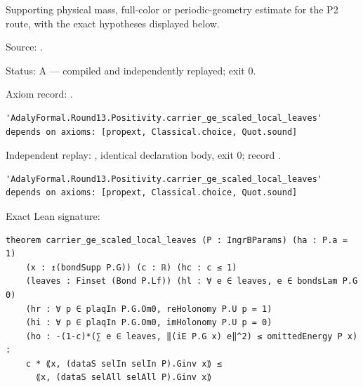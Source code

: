 \begin{theorem}[bp-455]
\label{bp-455}
\leanok
Supporting physical mass, full-color or periodic-geometry estimate for the P2 route, with the exact hypotheses displayed below.

\par Source: \texttt{}.
\par Status: A — compiled and independently replayed; exit 0.
\par Axiom record: \texttt{}.
\begin{verbatim}
'AdalyFormal.Round13.Positivity.carrier_ge_scaled_local_leaves' depends on axioms: [propext, Classical.choice, Quot.sound]
\end{verbatim}
\par Independent replay: \texttt{}, identical declaration body, exit 0; record \texttt{}.
\begin{verbatim}
'AdalyFormal.Round13.Positivity.carrier_ge_scaled_local_leaves' depends on axioms: [propext, Classical.choice, Quot.sound]
\end{verbatim}
\par Exact Lean signature:
\begin{verbatim}
theorem carrier_ge_scaled_local_leaves (P : IngrBParams) (ha : P.a = 1)
    (x : ↥(bondSupp P.G)) (c : ℝ) (hc : c ≤ 1)
    (leaves : Finset (Bond P.Lf)) (hl : ∀ e ∈ leaves, e ∈ bondsLam P.G 0)
    (hr : ∀ p ∈ plaqIn P.G.Om0, reHolonomy P.U p = 1)
    (hi : ∀ p ∈ plaqIn P.G.Om0, imHolonomy P.U p = 0)
    (ho : -(1-c)*(∑ e ∈ leaves, ‖(iE P.G x) e‖^2) ≤ omittedEnergy P x) :
    c * ⟪x, (dataS selIn selIn P).Ginv x⟫ ≤
      ⟪x, (dataS selAll selAll P).Ginv x⟫
\end{verbatim}
\end{theorem}

